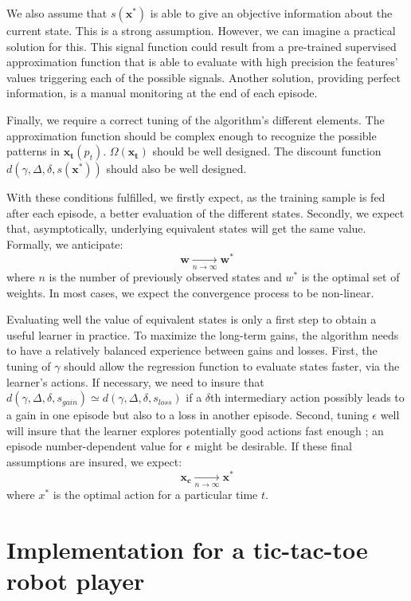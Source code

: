 \documentclass[scrartcl, 10.5 pt, conference]{ieeeconf}
\newcommand{\B}[1]{\mathbf{#1}}
\begin{document}
We also assume that $s(\B{x^*})$ is able to give an objective information about the current state. This is a strong assumption. However, we can imagine a practical solution for this. This signal function could result from a pre-trained supervised approximation function that is able to evaluate with high precision the features’ values triggering each of the possible signals. Another solution, providing perfect information, is a manual monitoring at the end of each episode.

Finally, we require a correct tuning of the algorithm’s different elements. The approximation function should be complex enough to recognize the possible patterns in $\B{x_t}(p_t)$. $\Omega(\B{x_t})$ should be well designed. The discount function $d(\gamma, \Delta, \delta, s(\B{x^*}))$ should also be well designed.

With these conditions fulfilled, we firstly expect, as the training sample is fed after each episode, a better evaluation of the different states. Secondly, we expect that, asymptotically, underlying equivalent states will get the same value. Formally, we anticipate:
$$\B{w} \xrightarrow[n \to \infty]{} \B{w^*}$$
where $n$ is the number of previously observed states and $w^*$ is the optimal set of weights. In most cases, we expect the convergence process to be non-linear.

Evaluating well the value of equivalent states is only a first step to obtain a useful learner in practice. To maximize the long-term gains, the algorithm needs to have a relatively balanced experience between gains and losses. First, the tuning of $\gamma$ should allow the regression function to evaluate states faster, via the learner's actions. If necessary, we need to insure that
$d(\gamma, \Delta, \delta, s_{gain}) \simeq d(\gamma, \Delta, \delta, s_{loss})$
if a $\delta$th intermediary action possibly leads to a gain in one episode but also to a loss in another episode. Second, tuning $\epsilon$ well will insure that the learner explores potentially good actions fast enough ; an episode number-dependent value for $\epsilon$ might be desirable. If these final assumptions are insured, we expect:
$$\B{x_c} \xrightarrow[n \to \infty]{} \B{x^*}$$
where $x^*$ is the optimal action for a particular time $t$.

\section{Implementation for a tic-tac-toe robot player}
\end{document}
